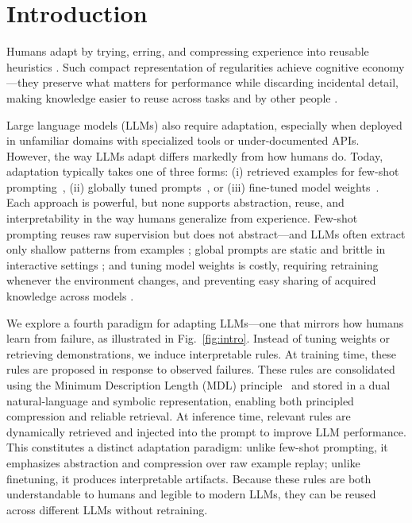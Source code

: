 \section{Introduction}

Humans adapt by trying, erring, and compressing experience into reusable heuristics \citep{kolb1984experiential,metcalfe2017learning,gigerenzer2011heuristic}.
Such compact representation of regularities achieve cognitive economy---they preserve what matters for performance while discarding incidental detail, making knowledge easier to reuse across tasks and by other people \citep{rosch1978principles}. 



Large language models (LLMs) \citep{brown2020language, bai2023qwen, team2023gemini, grattafiori2024llama} also require adaptation, especially when deployed in unfamiliar domains with specialized tools or under-documented APIs. 
However, the way LLMs adapt differs markedly from how humans do. Today, adaptation typically takes one of three forms: (i) retrieved examples for few-shot prompting~\citep{brown2020language,yizhe2021fewshot}, (ii) globally tuned prompts~\citep{pryzant2023automatic,cui2025see}, or (iii) fine-tuned model weights~\citep{hu2021lora}.
Each approach is powerful, but none supports abstraction, reuse, and interpretability in the way humans generalize from experience. Few-shot prompting reuses raw supervision but does not abstract—and LLMs often extract only shallow patterns from examples \citep{wei2023differently}; global prompts are static and brittle in interactive settings \citep{verma2024brittle}; and tuning model weights is costly, requiring retraining whenever the environment changes, 
and preventing easy sharing of acquired knowledge across models \citep{yang2024model}.


We explore a fourth paradigm for adapting LLMs—one that mirrors how humans learn from failure, as illustrated in Fig.~\ref{fig:intro}. Instead of tuning weights or retrieving demonstrations, we induce interpretable rules. At training time, these rules are proposed in response to observed failures. 
These rules are consolidated using the Minimum Description Length (MDL) principle~\citep{rissanen1978modeling,Grunwald07MDL} and stored in a dual natural-language and symbolic representation, enabling both principled compression and reliable retrieval.
At inference time, relevant rules are dynamically retrieved and injected into the prompt to improve LLM performance. 
This constitutes a distinct adaptation paradigm: unlike few-shot prompting, it emphasizes abstraction and compression over raw example replay; unlike finetuning, it produces interpretable artifacts. Because these rules are both understandable to humans and legible to modern LLMs, they can be reused across different LLMs without retraining.

